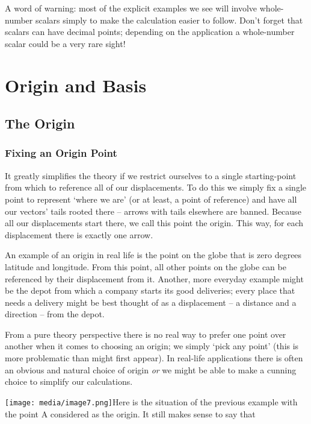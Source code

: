 \documentclass[oneside,english]{amsbook}
\numberwithin{section}{chapter}
\theoremstyle{plain}
\theoremstyle{definition}
\begin{document}
A word of warning: most of the explicit examples we see will involve
whole-number scalars simply to make the calculation easier to follow.
Don't forget that scalars can have decimal points; depending on the
application a whole-number scalar could be a very rare sight!

\section{Origin and Basis}

\subsection{The Origin}

\subsubsection{Fixing an Origin Point}

It greatly simplifies the theory if we restrict ourselves to a single
starting-point from which to reference all of our displacements. To do
this we simply fix a single point to represent `where we are' (or at
least, a point of reference) and have all our vectors' tails rooted
there -- arrows with tails elsewhere are banned. Because all our
displacements start there, we call this point the origin. This way, for
each displacement there is exactly one arrow.

An example of an origin in real life is the point on the globe that is
zero degrees latitude and longitude. From this point, all other points
on the globe can be referenced by their displacement from it. Another,
more everyday example might be the depot from which a company starts its
good deliveries; every place that needs a delivery might be best thought
of as a displacement -- a distance and a direction -- from the depot.

From a pure theory perspective there is no real way to prefer one point
over another when it comes to choosing an origin; we simply `pick any
point' (this is more problematic than might first appear). In real-life
applications there is often an obvious and natural choice of origin
\emph{or} we might be able to make a cunning choice to simplify our
calculations.

\texttt{[image: media/image7.png]}Here is
the situation of the previous example with the point A considered as the
origin. It still makes sense to say that
\end{document}

